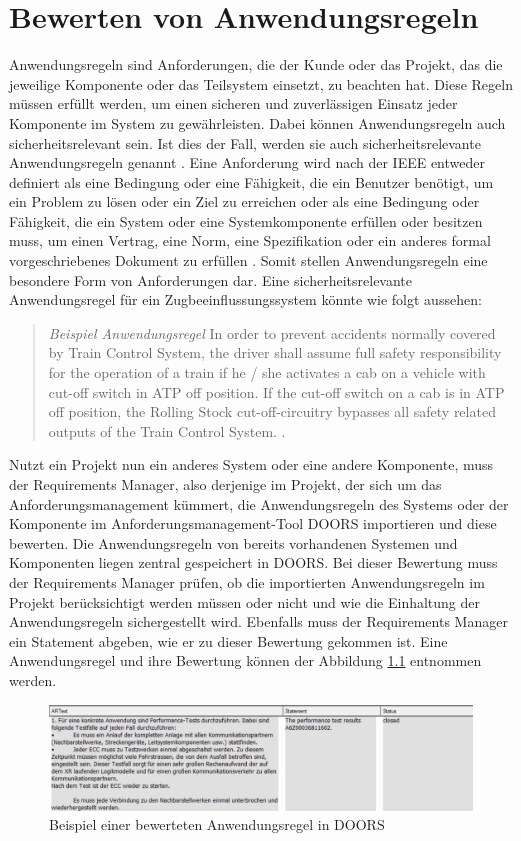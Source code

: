 \chapter{Bewerten von Anwendungsregeln}
\label{chap:kapitel2}

Anwendungsregeln sind Anforderungen, die der Kunde oder das Projekt, das die jeweilige Komponente oder das Teilsystem einsetzt, zu beachten hat. 
Diese Regeln müssen erfüllt werden, um einen sicheren und zuverlässigen Einsatz jeder Komponente im System zu gewährleisten. 
Dabei können Anwendungsregeln auch sicherheitsrelevant sein. Ist dies der Fall, werden sie auch sicherheitsrelevante Anwendungsregeln genannt \cite[S.9]{q2}. Eine Anforderung wird nach der 
IEEE entweder definiert als eine Bedingung oder eine Fähigkeit, die ein Benutzer benötigt, um ein Problem zu lösen oder ein Ziel zu erreichen oder als eine Bedingung oder Fähigkeit, 
die ein System oder eine Systemkomponente erfüllen oder besitzen muss, um einen Vertrag, eine Norm, eine Spezifikation oder ein anderes formal vorgeschriebenes Dokument 
zu erfüllen \cite[S.62]{q4}. Somit stellen Anwendungsregeln eine besondere Form von Anforderungen dar. Eine sicherheitsrelevante Anwendungsregel 
für ein Zugbeeinflussungssystem könnte wie folgt aussehen:

\begin{quotation}
	\textit{Beispiel Anwendungsregel} \glqq In order to prevent accidents normally covered by Train Control System, the driver shall assume full safety responsibility for the operation of a train if he / she activates a cab on a vehicle 
    with cut-off switch in \glqq ATP off\grqq{} position. If the cut-off switch on a cab is in \glqq ATP off\grqq{} position, the Rolling Stock cut-off-circuitry bypasses all safety related outputs of the 
    Train Control System.\grqq{} \cite[S.7]{q1}.
\end{quotation}

Nutzt ein Projekt nun ein anderes System oder eine andere Komponente, muss der Requirements Manager, also derjenige im Projekt, der sich um das Anforderungsmanagement kümmert, 
die Anwendungsregeln des Systems oder der Komponente im Anforderungsmanagement-Tool \acs*{DOORS} importieren und diese bewerten. Die Anwendungsregeln von bereits vorhandenen Systemen 
und Komponenten liegen zentral gespeichert in \acs{DOORS}. Bei dieser Bewertung muss der Requirements Manager prüfen, ob die importierten Anwendungsregeln im Projekt berücksichtigt 
werden müssen oder nicht und wie die Einhaltung der Anwendungsregeln sichergestellt wird. Ebenfalls muss der Requirements Manager ein Statement abgeben, wie er zu dieser Bewertung gekommen ist. 
Eine Anwendungsregel und ihre Bewertung können der Abbildung \ref*{fig:Bewertete Anwendungsregel} entnommen werden.

\begin{figure}[h]
    \centering
    \includegraphics[width = \textwidth]{abbildungen/Bewertete Anwendungsregel.PNG}
    \caption{Beispiel einer bewerteten Anwendungsregel in \acs{DOORS}}
    \label{fig:Bewertete Anwendungsregel}
\end{figure}